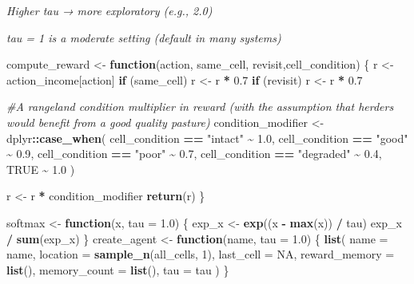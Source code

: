 \documentclass[
]{article}
\newenvironment{Shaded}{\begin{snugshade}}{\end{snugshade}}
\newcommand{\AttributeTok}[1]{\textcolor[rgb]{0.13,0.29,0.53}{#1}}
\newcommand{\CommentTok}[1]{\textcolor[rgb]{0.56,0.35,0.01}{\textit{#1}}}
\newcommand{\ConstantTok}[1]{\textcolor[rgb]{0.56,0.35,0.01}{#1}}
\newcommand{\ControlFlowTok}[1]{\textcolor[rgb]{0.13,0.29,0.53}{\textbf{#1}}}
\newcommand{\DecValTok}[1]{\textcolor[rgb]{0.00,0.00,0.81}{#1}}
\newcommand{\FloatTok}[1]{\textcolor[rgb]{0.00,0.00,0.81}{#1}}
\newcommand{\FunctionTok}[1]{\textcolor[rgb]{0.13,0.29,0.53}{\textbf{#1}}}
\newcommand{\NormalTok}[1]{#1}
\newcommand{\OtherTok}[1]{\textcolor[rgb]{0.56,0.35,0.01}{#1}}
\newcommand{\SpecialCharTok}[1]{\textcolor[rgb]{0.81,0.36,0.00}{\textbf{#1}}}
\newcommand{\StringTok}[1]{\textcolor[rgb]{0.31,0.60,0.02}{#1}}
\begin{document}
\emph{Higher tau → more exploratory (e.g., 2.0)}

\emph{tau = 1 is a moderate setting (default in many systems)}

\begin{Shaded}
\begin{Highlighting}[]
\NormalTok{compute\_reward }\OtherTok{\textless{}{-}} \ControlFlowTok{function}\NormalTok{(action, same\_cell, revisit,cell\_condition) \{}
\NormalTok{  r }\OtherTok{\textless{}{-}}\NormalTok{ action\_income[action]}
  \ControlFlowTok{if}\NormalTok{ (same\_cell) r }\OtherTok{\textless{}{-}}\NormalTok{ r }\SpecialCharTok{*} \FloatTok{0.7}
  \ControlFlowTok{if}\NormalTok{ (revisit) r }\OtherTok{\textless{}{-}}\NormalTok{ r }\SpecialCharTok{*} \FloatTok{0.7}
  
  \CommentTok{\#A rangeland condition multiplier in reward (with the assumption that herders would benefit from a good quality pasture)}
\NormalTok{  condition\_modifier }\OtherTok{\textless{}{-}}\NormalTok{ dplyr}\SpecialCharTok{::}\FunctionTok{case\_when}\NormalTok{(}
\NormalTok{    cell\_condition }\SpecialCharTok{==} \StringTok{"intact"}   \SpecialCharTok{\textasciitilde{}} \FloatTok{1.0}\NormalTok{,}
\NormalTok{    cell\_condition }\SpecialCharTok{==} \StringTok{"good"}     \SpecialCharTok{\textasciitilde{}} \FloatTok{0.9}\NormalTok{,}
\NormalTok{    cell\_condition }\SpecialCharTok{==} \StringTok{"poor"}     \SpecialCharTok{\textasciitilde{}} \FloatTok{0.7}\NormalTok{,}
\NormalTok{    cell\_condition }\SpecialCharTok{==} \StringTok{"degraded"} \SpecialCharTok{\textasciitilde{}} \FloatTok{0.4}\NormalTok{,}
    \ConstantTok{TRUE} \SpecialCharTok{\textasciitilde{}} \FloatTok{1.0}
\NormalTok{  )}
  
\NormalTok{  r }\OtherTok{\textless{}{-}}\NormalTok{ r }\SpecialCharTok{*}\NormalTok{ condition\_modifier}
  \FunctionTok{return}\NormalTok{(r)}
\NormalTok{\}}

\NormalTok{softmax }\OtherTok{\textless{}{-}} \ControlFlowTok{function}\NormalTok{(x, }\AttributeTok{tau =} \FloatTok{1.0}\NormalTok{) \{}
\NormalTok{  exp\_x }\OtherTok{\textless{}{-}} \FunctionTok{exp}\NormalTok{((x }\SpecialCharTok{{-}} \FunctionTok{max}\NormalTok{(x)) }\SpecialCharTok{/}\NormalTok{ tau)}
\NormalTok{  exp\_x }\SpecialCharTok{/} \FunctionTok{sum}\NormalTok{(exp\_x)}
\NormalTok{\}}
\NormalTok{create\_agent }\OtherTok{\textless{}{-}} \ControlFlowTok{function}\NormalTok{(name, }\AttributeTok{tau =} \FloatTok{1.0}\NormalTok{) \{}
  \FunctionTok{list}\NormalTok{(}
    \AttributeTok{name =}\NormalTok{ name,}
    \AttributeTok{location =} \FunctionTok{sample\_n}\NormalTok{(all\_cells, }\DecValTok{1}\NormalTok{),}
    \AttributeTok{last\_cell =} \ConstantTok{NA}\NormalTok{,}
    \AttributeTok{reward\_memory =} \FunctionTok{list}\NormalTok{(),}
    \AttributeTok{memory\_count =} \FunctionTok{list}\NormalTok{(),}
    \AttributeTok{tau =}\NormalTok{ tau}
\NormalTok{  )}
\NormalTok{\}}
\end{Highlighting}
\end{Shaded}
\end{document}
